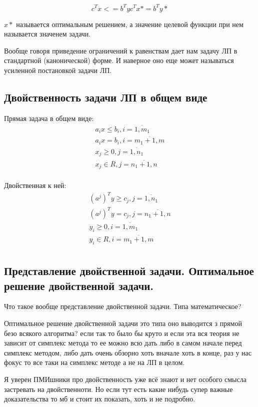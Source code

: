 \documentclass[a4paper,article,14pt]{extarticle}
\begin{document}
\[
c^T x <= b^T y

c^T x* = b^T y*
\]

\(x*\) называется оптимальным решением, а значение целевой функции при нем называется значенем задачи.

Вообще говоря приведение ограничений к равенствам дает нам задачу ЛП в стандартной (канонической) форме.
И наверное оно еще может называться усиленной постановкой задачи ЛП.

\subsection{Двойственность задачи ЛП в общем виде}

Прямая задача в общем виде:
\begin{gather}
    a_ix \le b_i, i = \overline{1, m_1} \\
    a_ix = b_i, i = \overline{m_1 + 1, m} \\
    x_j \ge 0, j = \overline{1, n_1} \\
    x_j \in R, j = \overline{n_1 + 1, n} \\
\end{gather}

Двойственная к ней:
\begin{gather}
    (a^j)^Ty \ge c_j, j = \overline{1, n_1} \\
    (a^j)^Ty = c_j, j = \overline{n_1 + 1, n} \\
    y_i \ge 0, i = \overline{1, m_1} \\
    y_i \in R, i = \overline{m_1 + 1, m} \\
\end{gather}

\subsection{Представление двойственной задачи. Оптимальное решение двойственной задачи.}

Что такое вообще представление двойственной задачи.
Типа математическое?

Оптимальное решение двойственной задачи это типа оно выводится з прямой безо всякого алгоритма?
если так то было бы круто и если эта вся теория не зависит от симплекс метода то ее можно всю дать либо в самом начале перед симплекс методом, либо дать очень обзорно хоть вначале хоть в конце, раз у нас фокус то все таки на симплекс методе а не на ЛП в целом.

Я уверен ПМИшники про двойственность уже всё знают и нет особого смысла застревать на двойственноти.
Но если тут есть какие нибудь супер важные доказательства то мб и стоит их показать, хоть и не подробно.
\end{document}
